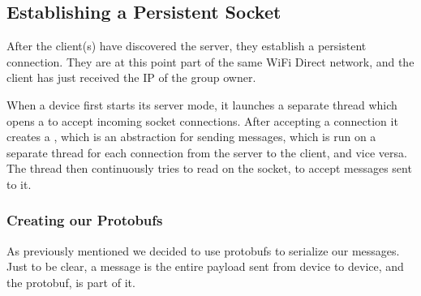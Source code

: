 \subsection{Establishing a Persistent Socket}

After the client(s) have discovered the server, they establish a persistent connection.
They are at this point part of the same WiFi Direct network, and the client has just received the IP of the group owner.

When a device first starts its server mode, it launches a separate thread which opens a  to accept incoming socket connections.
After accepting a connection it creates a , which is an abstraction for sending messages, which is run on a separate thread for each connection from the server to the client, and vice versa.
The thread then continuously tries to read on the socket, to accept messages sent to it.

\subsubsection*{Creating our Protobufs}
As previously mentioned we decided to use protobufs to serialize our messages.
Just to be clear, a message is the entire payload sent from device to device, and the protobuf, is part of it.

